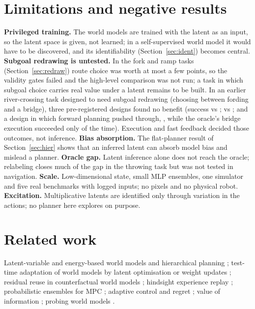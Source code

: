 \documentclass[11pt]{article}
\begin{document}
\section{Limitations and negative results}
\label{sec:lim}
\textbf{Privileged training.} The world models are trained with the latent as an input, so the latent space is given,
not learned; in a self-supervised world model \citep{lecun2022path,hjepa_2610_06805} it would have to be discovered, and its
identifiability (Section~\ref{sec:ident}) becomes central. \textbf{Subgoal redrawing is untested.} In the fork and ramp tasks (Section~\ref{sec:redraw}) route choice was worth at
most a few points, so the validity gates failed and the high-level comparison was not run; a task in which subgoal choice carries real value
under a latent remains to be built. In an earlier river-crossing task designed to need subgoal
redrawing (choosing between fording and a bridge), three pre-registered designs found no benefit (success \rvOneHind{} vs
\rvOneFwd{}; \rvTwoHind{} vs \rvTwoFwd; and a design in which forward planning pushed through, \rvThreeFwd{}, while the
oracle's bridge execution succeeded only \rvThreeOracle{} of the time). Execution and fast feedback decided those
outcomes, not inference. \textbf{Bias absorption.} The flat-planner result of Section~\ref{sec:hier} shows that an
inferred latent can absorb model bias and mislead a planner. \textbf{Oracle gap.} Latent inference alone does not reach
the oracle; relabeling closes much of the gap in the throwing task but was not tested in navigation. \textbf{Scale.}
Low-dimensional state, small MLP ensembles, one simulator and five real benchmarks with logged inputs; no pixels and no
physical robot. \textbf{Excitation.} Multiplicative latents are identified only through variation in the actions;
no planner here explores on purpose.

\section{Related work}
Latent-variable and energy-based world models and hierarchical planning \citep{lecun2022path,hjepa_2610_06805};
test-time adaptation of world models by latent optimisation \citep{t2z_2610_22364} or weight updates
\citep{adajepa_2606_32026,jepattt_2610_00722}; residual reuse in counterfactual world models \citep{cwm_2611_24778};
hindsight experience replay \citep{andrychowicz2017her}; probabilistic ensembles for MPC \citep{chua2018pets}; adaptive
control and regret \citep{laiwei1982,abbasi2011,simchowitz2020,cassel2020,astrom_wittenmark}; value of information
\citep{blackwell1953}; probing world models \citep{li2023othello,probing_rl_wm_2603_21546}.
\end{document}
